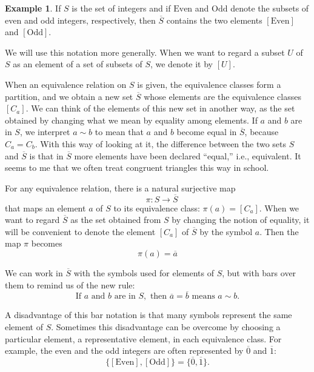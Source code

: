 \documentclass[
]{book}
\theoremstyle{definition}
\theoremstyle{definition}
\newtheorem{example}{Example}[chapter]
\theoremstyle{definition}
\theoremstyle{definition}
\theoremstyle{remark}
\begin{document}
\begin{example}
\protect\hypertarget{exm:unnamed-chunk-26}{}\label{exm:unnamed-chunk-26}If \(S\) is the set of integers and if \(\text{Even}\) and \(\text{Odd}\) denote the subsets of even and odd integers, respectively, then \(\overline{S}\) contains the two elements \([\text{Even}]\) and \([\text{Odd}]\).
\end{example}

We will use this notation more generally. When we want to regard a subset \(U\) of \(S\) as an element of a set of subsets of \(S\), we denote it by \([U]\).

When an equivalence relation on \(S\) is given, the equivalence classes form a partition, and we obtain a new set \(\overline{S}\) whose elements are the equivalence classes \([C_a]\). We can think of the elements of this new set in another way, as the set obtained by changing what we mean by equality among elements. If \(a\) and \(b\) are in \(S\), we interpret \(a \sim b\) to mean that \(a\) and \(b\) become equal in \(\overline{S}\), because \(C_a = C_b\). With this way of looking at it, the difference between the two sets \(S\) and \(\overline{S}\) is that in \(\overline{S}\) more elements have been declared ``equal,'' i.e., equivalent. It seems to me that we often treat congruent triangles this way in school.

For any equivalence relation, there is a natural surjective map
\begin{equation}
 \quad \pi : S \to \overline{S}
\end{equation}
that maps an element \(a\) of \(S\) to its equivalence class: \(\pi(a) = [C_a]\). When we want to regard \(\overline{S}\) as the set obtained from \(S\) by changing the notion of equality, it will be convenient to denote the element \([C_a]\) of \(\overline{S}\) by the symbol \(a\). Then the map \(\pi\) becomes
\begin{equation}
\pi(a) = \overline{a}
\end{equation}

We can work in \(\overline{S}\) with the symbols used for elements of \(S\), but with bars over them to remind us of the new rule:
\begin{equation}
\text{If } a \text{ and } b \text{ are in } S, \text{ then } \overline{a} = \overline{b} \text{ means } a \sim b.
\end{equation}

A disadvantage of this bar notation is that many symbols represent the same element of \(S\). Sometimes this disadvantage can be overcome by choosing a particular element, a representative element, in each equivalence class. For example, the even and the odd integers are often represented by \(\overline{0}\) and \(\overline{1}\):
\begin{equation}
\{[\text{Even}], [\text{Odd}]\} = \{ \overline{0}, \overline{1}\}.
\end{equation}
\end{document}
